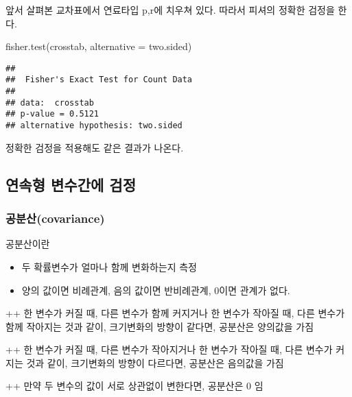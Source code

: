 \documentclass[
]{article}
\newenvironment{Shaded}{\begin{snugshade}}{\end{snugshade}}
\newcommand{\AttributeTok}[1]{\textcolor[rgb]{0.77,0.63,0.00}{#1}}
\newcommand{\FunctionTok}[1]{\textcolor[rgb]{0.00,0.00,0.00}{#1}}
\newcommand{\NormalTok}[1]{#1}
\newcommand{\SpecialCharTok}[1]{\textcolor[rgb]{0.00,0.00,0.00}{#1}}
\newcommand{\StringTok}[1]{\textcolor[rgb]{0.31,0.60,0.02}{#1}}
\providecommand{\tightlist}{%
  \setlength{\itemsep}{0pt}\setlength{\parskip}{0pt}}
\begin{document}
앞서 살펴본 교차표에서 연료타입 p,r에 치우쳐 있다.
따라서 피셔의 정확한 검정을 한다.

\begin{Shaded}
\begin{Highlighting}[]
\FunctionTok{fisher.test}\NormalTok{(crosstab, }\AttributeTok{alternative =} \StringTok{\textquotesingle{}two.sided\textquotesingle{}}\NormalTok{)}
\end{Highlighting}
\end{Shaded}

\begin{verbatim}
## 
##  Fisher's Exact Test for Count Data
## 
## data:  crosstab
## p-value = 0.5121
## alternative hypothesis: two.sided
\end{verbatim}

정확한 검정을 적용해도 같은 결과가 나온다.

\hypertarget{uxc5f0uxc18duxd615-uxbcc0uxc218uxac04uxc5d0-uxac80uxc815}{%
\subsection{연속형 변수간에 검정}\label{uxc5f0uxc18duxd615-uxbcc0uxc218uxac04uxc5d0-uxac80uxc815}}

\hypertarget{uxacf5uxbd84uxc0b0covariance}{%
\subsubsection{공분산(covariance)}\label{uxacf5uxbd84uxc0b0covariance}}

공분산이란

\begin{itemize}
\tightlist
\item
  두 확률변수가 얼마나 함께 변화하는지 측정
\item
  양의 값이면 비례관계, 음의 값이면 반비례관계, 0이면 관계가 없다.
\end{itemize}

++ 한 변수가 커질 때, 다른 변수가 함께 커지거나 한 변수가 작아질 때, 다른 변수가 함께 작아지는 것과 같이, 크기변화의 방향이 같다면, 공분산은 양의값을 가짐

++ 한 변수가 커질 때, 다른 변수가 작아지거나 한 변수가 작아질 때, 다른 변수가 커지는 것과 같이, 크기변화의 방향이 다르다면, 공분산은 음의값을 가짐

++ 만약 두 변수의 값이 서로 상관없이 변한다면, 공분산은 0 임

\begin{Shaded}
\end{Shaded}
\end{document}
